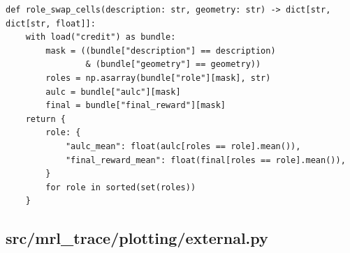 \documentclass[a4paper,10pt]{article}
\begin{document}
\begin{Verbatim}
def role_swap_cells(description: str, geometry: str) -> dict[str, dict[str, float]]:
    with load("credit") as bundle:
        mask = ((bundle["description"] == description)
                & (bundle["geometry"] == geometry))
        roles = np.asarray(bundle["role"][mask], str)
        aulc = bundle["aulc"][mask]
        final = bundle["final_reward"][mask]
    return {
        role: {
            "aulc_mean": float(aulc[roles == role].mean()),
            "final_reward_mean": float(final[roles == role].mean()),
        }
        for role in sorted(set(roles))
    }
\end{Verbatim}
\subsection{src/mrl\_trace/plotting/external.py}
\end{document}

